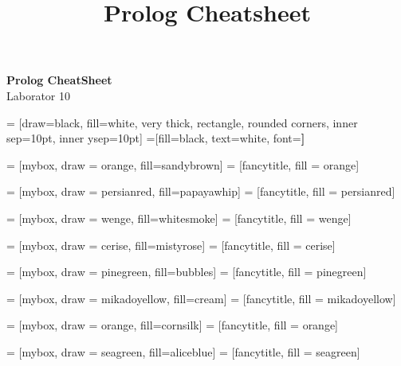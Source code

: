 \documentclass[a3paper]{article}
\title{Prolog Cheatsheet}
\begin{document}
\begin{center}{\huge{\textbf{Prolog CheatSheet}}}\\
{\large Laborator 10}
\end{center}

\begin{multicols*}{3}

 = [draw=black, fill=white, very thick,
    rectangle, rounded corners, inner sep=10pt, inner ysep=10pt]
 =[fill=black, text=white, font=\bfseries]

 = [mybox, draw = orange, fill=sandybrown]
 = [fancytitle, fill = orange]


 = [mybox, draw = persianred, fill=papayawhip]
 = [fancytitle, fill = persianred]

 = [mybox, draw = wenge, fill=whitesmoke]
 = [fancytitle, fill = wenge]

 = [mybox, draw = cerise, fill=mistyrose]
 = [fancytitle, fill = cerise]

 = [mybox, draw = pinegreen, fill=bubbles]
 = [fancytitle, fill = pinegreen]

 = [mybox, draw = mikadoyellow, fill=cream]
 = [fancytitle, fill = mikadoyellow]

 = [mybox, draw = orange, fill=cornsilk]
 = [fancytitle, fill = orange]

 = [mybox, draw = seagreen, fill=aliceblue]
 = [fancytitle, fill = seagreen]


\end{multicols*}
\end{document}
